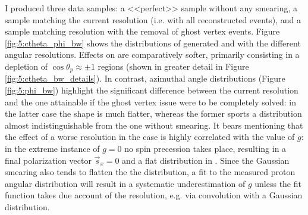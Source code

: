 I produced three data samples:
a <<perfect>> sample without any smearing, a sample matching the current resolution (i.e. with all reconstructed \demonstratorshort events), and a sample matching resolution with the removal of ghost vertex events.
Figure \ref{fig:5:ctheta_phi_bw} shows the distributions of generated \cthetap and \phip with the different angular resolutions.
Effects on \cthetap are comparatively softer, primarily consisting in a depletion of $\cos\theta_p \approx \pm 1$ regions (shown in greater detail in Figure \ref{fig:5:ctheta_bw_details}).
In contrast, azimuthal angle \phip distributions (Figure \ref{fig:5:phi_bw}) highlight the significant difference between the current resolution and the one attainable if the ghost vertex issue were to be completely solved:
in the latter case the shape is much flatter, whereas the former sports a distribution almost indistinguishable from the one without smearing.
It bears mentioning that the effect of a worse resolution in the \phip case is highly correlated with the value of $g$:
in the extreme instance of $g=0$ no spin precession takes place, resulting in a final polarization vector $\vec{s}_x = 0$ and a flat distribution in \phip.
Since the Gaussian smearing also tends to flatten the the \phip distribution, a fit to the measured proton angular distribution will result in a systematic underestimation of $g$ unless the fit function takes due account of the resolution, e.g. via convolution with a Gaussian distribution.

